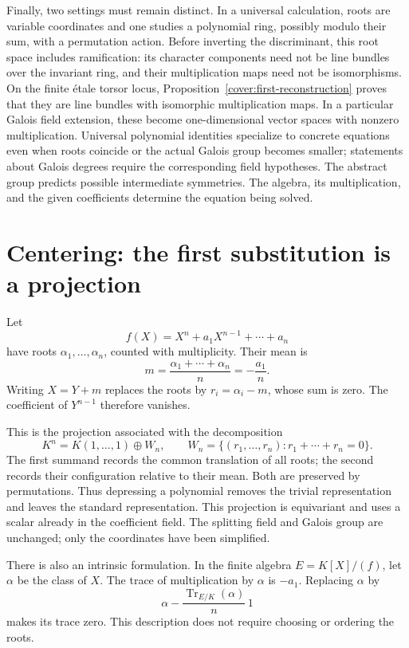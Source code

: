 \documentclass[11pt]{article}
\theoremstyle{remark}
\newcommand{\Tr}{\operatorname{Tr}}
\begin{document}
Finally, two settings must remain distinct. In a universal calculation, roots are variable coordinates and one studies a polynomial ring, possibly modulo their sum, with a permutation action. Before inverting the discriminant, this root space includes ramification: its character components need not be line bundles over the invariant ring, and their multiplication maps need not be isomorphisms. On the finite \'etale torsor locus, Proposition~\ref{cover:first-reconstruction} proves that they are line bundles with isomorphic multiplication maps. In a particular Galois field extension, these become one-dimensional vector spaces with nonzero multiplication. Universal polynomial identities specialize to concrete equations even when roots coincide or the actual Galois group becomes smaller; statements about Galois degrees require the corresponding field hypotheses. The abstract group predicts possible intermediate symmetries. The algebra, its multiplication, and the given coefficients determine the equation being solved.

\section{Centering: the first substitution is a projection}
\label{sec:centering}

Let
\[
f(X)=X^n+a_1X^{n-1}+\cdots+a_n
\]
have roots \(\alpha_1,\ldots,\alpha_n\), counted with multiplicity. Their mean is
\[
m=\frac{\alpha_1+\cdots+\alpha_n}{n}=-\frac{a_1}{n}.
\]
Writing \(X=Y+m\) replaces the roots by \(r_i=\alpha_i-m\), whose sum is zero. The coefficient of \(Y^{n-1}\) therefore vanishes.

This is the projection associated with the decomposition
\begin{equation}
K^n=K(1,\ldots,1)\oplus W_n,
\qquad
W_n=\{(r_1,\ldots,r_n):r_1+\cdots+r_n=0\}.
\label{eq:centering}
\end{equation}
The first summand records the common translation of all roots; the second records their configuration relative to their mean. Both are preserved by permutations. Thus depressing a polynomial removes the trivial representation and leaves the standard representation. This projection is equivariant and uses a scalar already in the coefficient field. The splitting field and Galois group are unchanged; only the coordinates have been simplified.

There is also an intrinsic formulation. In the finite algebra \(E=K[X]/(f)\), let \(\alpha\) be the class of \(X\). The trace of multiplication by \(\alpha\) is \(-a_1\). Replacing \(\alpha\) by
\[
\alpha-\frac{\Tr_{E/K}(\alpha)}{n}\,1
\]
makes its trace zero. This description does not require choosing or ordering the roots.
\end{document}

